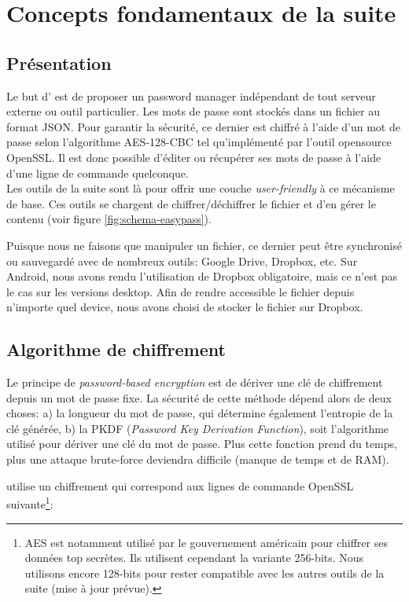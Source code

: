 
\section{Concepts fondamentaux de la suite \easypass{}}

\subsection{Présentation}
Le but d'\easypass{} est de proposer un password manager indépendant de tout serveur externe ou outil particulier. Les mots de passe sont stockés dans un fichier au format JSON. Pour garantir la sécurité, ce dernier est chiffré à l'aide d'un mot de passe selon l'algorithme AES-128-CBC tel qu'implémenté par l'outil opensource OpenSSL. Il est donc possible d'éditer ou récupérer ses mots de passe à l'aide d'une ligne de commande quelconque. \\
Les outils de la suite \easypass{} sont là pour offrir une couche \emph{user-friendly} à ce mécanisme de base. Ces outils se chargent de chiffrer/déchiffrer le fichier et d'en gérer le contenu (voir figure \ref{fig:schema-easypass}). 

Puisque nous ne faisons que manipuler un fichier, ce dernier peut être synchronisé ou sauvegardé avec de nombreux outils: Google Drive, Dropbox, etc. Sur Android, nous avons rendu l'utilisation de Dropbox obligatoire, mais ce n'est pas le cas sur les versions desktop.
Afin de rendre accessible le fichier depuis n'importe quel device, nous avons choisi de stocker le fichier sur Dropbox. 


\subsection{Algorithme de chiffrement}

Le principe de \emph{password-based encryption} est de dériver une clé de chiffrement depuis un mot de passe fixe. La sécurité de cette méthode dépend alors de deux choses: a) la longueur du mot de passe, qui détermine également l'entropie de la clé générée, b) la PKDF (\emph{Password Key Derivation Function}), soit l'algorithme utilisé pour dériver une clé du mot de passe. Plus cette fonction prend du temps, plus une attaque brute-force deviendra difficile (manque de temps et de RAM).

\easypass{} utilise un chiffrement qui correspond aux lignes de commande OpenSSL suivante\footnote{AES est notamment utilisé par le gouvernement américain pour chiffrer ses données top secrètes. Ils utilisent cependant la variante 256-bits. Nous utilisons encore 128-bits pour rester compatible avec les autres outils de la suite (mise à jour prévue).}:

